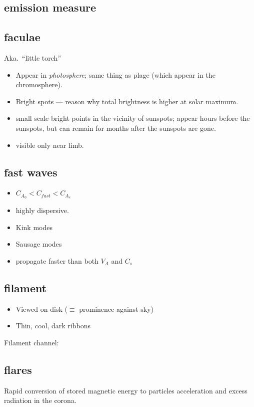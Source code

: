 \documentclass{article}
\begin{document}
\subsection{emission measure}

\subsection{faculae}
Aka.\ ``little torch''
    \begin{itemize}
        \item Appear in \emph{photosphere}; same thing as plage
            (which appear in the chromosphere).
        \item Bright spots --- reason why total brightness is higher at
            solar maximum.
        \item small scale bright points in the vicinity of sunspots;
            appear hours before the sunspots, but can remain for months
            after the sunspots are gone.
        \item visible only near limb.
    \end{itemize}
\subsection{fast waves}

\begin{itemize}
    \item $C_{A_0} < C_{fast} < C_{A_e} $
    \item highly dispersive.
    \item Kink modes
    \item Sausage modes
    \item propagate faster than both $V_A$ and $C_s$
\end{itemize}

\subsection{filament}
    \begin{itemize}
        \item Viewed on disk ($\equiv$ prominence against sky)
        \item Thin, cool, dark ribbons
    \end{itemize}
    Filament channel:

\subsection{flares}
Rapid conversion of stored magnetic energy to particles acceleration and
excess radiation in the corona.
\end{document}
